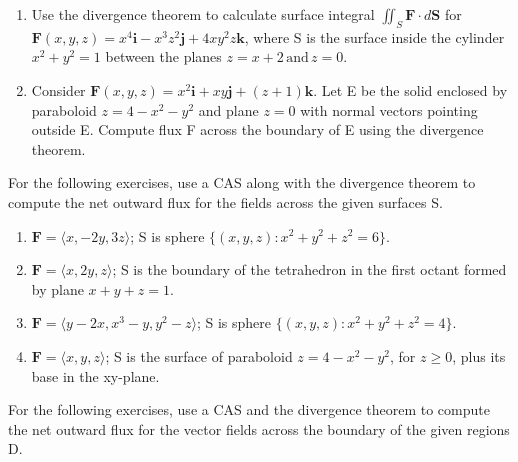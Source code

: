 \documentclass{exercises}
\begin{document}
\begin{enumerate}[start=1]
\item Use the divergence theorem to calculate surface integral $\iint_{S}\mathbf{F}\cdot d\mathbf{S}$ for $\mathbf{F}(x,y,z)=x^{4}\mathbf{i}-x^{3}z^{2}\mathbf{j}+4xy^{2}z\mathbf{k}$, where S is the surface inside the cylinder $x^{2}+y^{2}=1$ between the planes $z=x+2\,\text{and}\,z=0$.
\item Consider $\mathbf{F}(x,y,z)=x^{2}\mathbf{i}+xy\mathbf{j}+(z+1)\mathbf{k}$. Let E be the solid enclosed by paraboloid $z=4-x^{2}-y^{2}$ and plane $z=0$ with normal vectors pointing outside E. Compute flux F across the boundary of E using the divergence theorem.
\end{enumerate}

For the following exercises, use a CAS along with the divergence theorem to compute the net outward flux for the fields across the given surfaces S.

\begin{enumerate}[resume]
\item \techrequired $\mathbf{F}=\langle x,-2y,3z\rangle$; S is sphere $\{(x,y,z):x^{2}+y^{2}+z^{2}=6\}$.
\item \techrequired $\mathbf{F}=\langle x,2y,z\rangle$; S is the boundary of the tetrahedron in the first octant formed by plane $x+y+z=1$.
\item \techrequired $\mathbf{F}=\langle y-2x,x^{3}-y,y^{2}-z\rangle$; S is sphere $\{(x,y,z):x^{2}+y^{2}+z^{2}=4\}$.
\item \techrequired $\mathbf{F}=\langle x,y,z\rangle$; S is the surface of paraboloid $z=4-x^{2}-y^{2}$, for $z\ge0$, plus its base in the xy-plane.
\end{enumerate}

For the following exercises, use a CAS and the divergence theorem to compute the net outward flux for the vector fields across the boundary of the given regions D.
\end{document}

